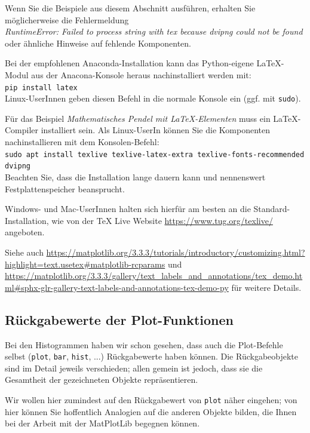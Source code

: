 \begin{hintbox}
Wenn Sie die Beispiele aus diesem Abschnitt ausführen, erhalten Sie möglicherweise die Fehlermeldung\\
\emph{RuntimeError: Failed to process string with tex because dvipng could not be found}\\
oder ähnliche Hinweise auf fehlende Komponenten.

Bei der empfohlenen Anaconda-Installation kann das Python-eigene LaTeX-Modul aus der Anacona-Konsole heraus nachinstalliert werden mit:\\
\texttt{pip install latex}\\
Linux-UserInnen geben diesen Befehl in die normale Konsole ein (ggf. mit \texttt{sudo}).

Für das Beispiel \emph{Mathematisches Pendel mit \LaTeX-Elementen} muss ein \LaTeX-Compiler installiert sein. Als Linux-UserIn können Sie die Komponenten nachinstallieren mit dem Konsolen-Befehl:\\
\texttt{sudo apt install texlive texlive-latex-extra texlive-fonts-recommended dvipng}\\
Beachten Sie, dass die Installation lange dauern kann und nennenswert Festplattenspeicher beansprucht.

Windows- und Mac-UserInnen halten sich hierfür am besten an die Standard-Installation, wie von der TeX Live Website \url{https://www.tug.org/texlive/} angeboten.
\end{hintbox}

Siehe auch \url{https://matplotlib.org/3.3.3/tutorials/introductory/customizing.html?highlight=text.usetex#matplotlib-rcparams} und \url{https://matplotlib.org/3.3.3/gallery/text_labels_and_annotations/tex_demo.html#sphx-glr-gallery-text-labels-and-annotations-tex-demo-py} für weitere Details.

\subsection{Rückgabewerte der Plot-Funktionen}
Bei den Histogrammen haben wir schon gesehen, dass auch die Plot-Befehle selbst (\texttt{plot}, \texttt{bar}, \texttt{hist}, ...) Rückgabewerte haben können. Die Rückgabeobjekte sind im Detail jeweils verschieden; allen gemein ist jedoch, dass sie die Gesamtheit der gezeichneten Objekte repräsentieren.

Wir wollen hier zumindest auf den Rückgabewert von \texttt{plot} näher eingehen; von hier können Sie hoffentlich Analogien auf die anderen Objekte bilden, die Ihnen bei der Arbeit mit der MatPlotLib begegnen können.

